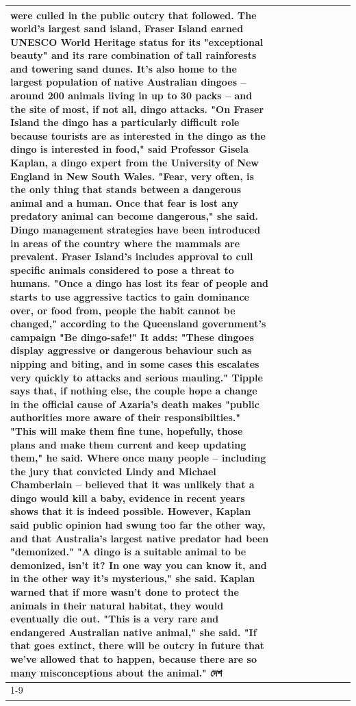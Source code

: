 \begin{table}[H]
\begin{tabular}{lllrlllll}
were culled in the public outcry that followed. The world's largest sand island, Fraser Island earned UNESCO World Heritage status for its "exceptional beauty" and its rare combination of tall rainforests and towering sand dunes. It's also home to the largest population of native Australian dingoes -- around 200 animals living in up to 30 packs -- and the site of most, if not all, dingo attacks. "On Fraser Island the dingo has a particularly difficult role because tourists are as interested in the dingo as the dingo is interested in food," said Professor Gisela Kaplan, a dingo expert from the University of New England in New South Wales. "Fear, very often, is the only thing that stands between a dangerous animal and a human. Once that fear is lost any predatory animal can become dangerous," she said. Dingo management strategies have been introduced in areas of the country where the mammals are prevalent. Fraser Island's includes approval to cull specific animals considered to pose a threat to humans. "Once a dingo has lost its fear of people and starts to use aggressive tactics to gain dominance over, or food from, people the habit cannot be changed," according to the Queensland government's campaign "Be dingo-safe!" It adds: "These dingoes display aggressive or dangerous behaviour such as nipping and biting, and in some cases this escalates very quickly to attacks and serious mauling." Tipple says that, if nothing else, the couple hope a change in the official cause of Azaria's death makes "public authorities more aware of their responsibilties." "This will make them fine tune, hopefully, those plans and make them current and keep updating them," he said. Where once many people -- including the jury that convicted Lindy and Michael Chamberlain -- believed that it was unlikely that a dingo would kill a baby, evidence in recent years shows that it is indeed possible. However, Kaplan said public opinion had swung too far the other way, and that Australia's largest native predator had been "demonized." "A dingo is a suitable animal to be demonized, isn't it? In one way you can know it, and in the other way it's mysterious," she said. Kaplan warned that if more wasn't done to protect the animals in their natural habitat, they would eventually die out. "This is a very rare and endangered Australian native animal," she said. "If that goes extinct, there will be outcry in future that we've allowed that to happen, because there are so many misconceptions about the animal." দেশ \\
\cline{1-9}

\end{tabular}
\end{table}
